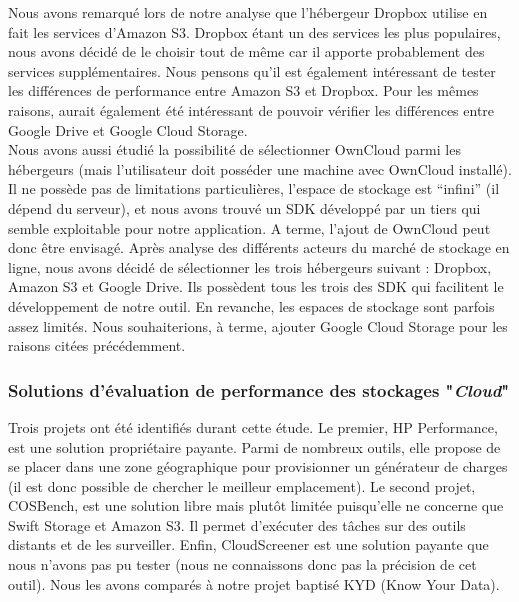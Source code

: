 \documentclass[10pt]{article}
\begin{document}
Nous avons remarqué lors de notre analyse que l’hébergeur Dropbox utilise en fait les services d'Amazon S3. Dropbox étant un des services les plus populaires, nous avons décidé de le choisir tout de même car il apporte probablement des services supplémentaires. Nous pensons qu’il est également intéressant de tester les différences de performance entre Amazon S3 et Dropbox. Pour les mêmes raisons, aurait également été intéressant de pouvoir vérifier les différences entre Google Drive et Google Cloud Storage.\\

Nous avons aussi étudié la possibilité de sélectionner OwnCloud parmi les hébergeurs (mais l’utilisateur doit posséder une machine avec OwnCloud installé). Il ne possède pas de limitations particulières, l’espace de stockage est “infini” (il dépend du serveur), et nous avons trouvé un SDK développé par un tiers qui semble exploitable pour notre application. A terme, l’ajout de OwnCloud peut donc être envisagé. Après analyse des différents acteurs du marché de stockage en ligne, nous avons décidé de sélectionner les trois hébergeurs suivant : Dropbox, Amazon S3 et Google Drive. Ils possèdent tous les trois des SDK qui facilitent le développement de notre outil. En revanche, les espaces de stockage sont parfois assez limités. Nous souhaiterions, à terme, ajouter Google Cloud Storage pour les raisons citées précédemment.

\subsubsection{Solutions d'évaluation de performance des stockages "\textit{Cloud}"}

Trois projets ont été identifiés durant cette étude. Le premier, HP Performance, est une solution propriétaire payante. Parmi de nombreux outils, elle propose de se placer dans une zone géographique pour provisionner un générateur de charges (il est donc possible de chercher le meilleur emplacement). Le second projet, COSBench, est une solution libre mais plutôt limitée puisqu’elle ne concerne que Swift Storage et Amazon S3. Il permet d'exécuter des tâches sur des outils distants et de les surveiller. Enfin, CloudScreener est une solution payante que nous n’avons pas pu tester (nous ne connaissons donc pas la précision de cet outil). Nous les avons comparés à notre projet baptisé KYD (Know Your Data).
\end{document}
